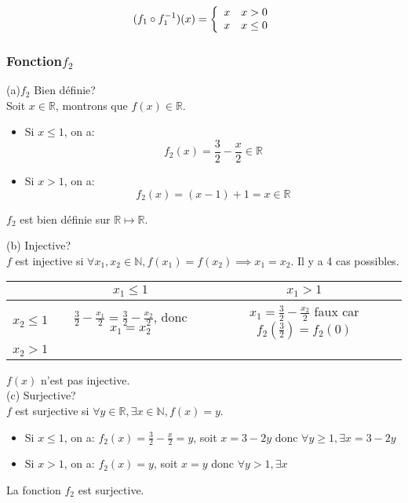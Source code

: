 \documentclass[]{book}
\theoremstyle{definition}
\newcommand{\bb}[1]{\mathbb{#1}}
\newcommand{\R}{\bb{R}}
\begin{document}
$$(f_1 \circ f_1^{-1})(x) =
\left\{ 
\begin{array}{l l}
 x & x > 0\\
 x & x \le 0\\
\end{array}
\right. 
$$


\subsubsection*{Fonction$f_2$}
(a)$f_2$ Bien d\'efinie?\\
Soit $x \in \R$, montrons que $f(x) \in \R$.
\begin{itemize}
\item Si $x \le 1$, on a: 
$$ f_2(x) = \frac{3}{2} - \frac{x}{2} \in \R$$
\item Si $x > 1$, on a:
$$f_2(x) = (x - 1) + 1 = x \in \R$$
\end{itemize}
$f_2$ est bien d\'efinie sur $\R \mapsto \R$.

(b) Injective?\\
$f$ est injective si $\forall x_1, x_2 \in \mathbb{N}, f(x_1) = f(x_2) \implies x_1 = x_2$. Il y a 4 cas possibles.

\begin{center}
\begin{tabular}{c|c|c} 
                 & $x_1 \le 1$ & $x_1 > 1$ \\
      \hline
     $x_2 \le 1$   & $\frac{3}{2} - \frac{x_1}{2} = \frac{3}{2} - \frac{x_2}{2}$, donc $x_1=x_2$ & $x_1 = \frac{3}{2} - \frac{x_2}{2}$ faux car $f_2(\frac{3}{2}) = f_2(0)$\\
      \hline
     $x_2 > 1$ & & \\
\end{tabular}
\end{center}
$f(x)$ n'est pas injective.\\

(c) Surjective?\\
$f$ est surjective si $\forall y \in \mathbb{R}, \exists x \in \mathbb{N}, f(x) = y$.\\
\begin{itemize}
\item Si $x \le 1$, on a: 
$ f_2(x) = \frac{3}{2} - \frac{x}{2} = y$, soit $x=3-2y$ donc $\forall y \ge 1, \exists x = 3 - 2y$
\item Si $x > 1$, on a:
$f_2(x) = y$, soit $x= y$ donc $\forall y >1, \exists x$
\end{itemize}
La fonction $f_2$ est surjective.
\end{document}
